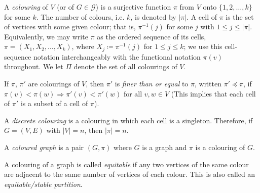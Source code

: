 \begin{definition}\label{def: colouring}
    A \emph{colouring} of $V$ (or of $G \mathrel{\in}\mathcal{G}$) is a surjective function $\pi$ from $V$ onto $\{1, 2,\ldots, k\}$ for some $k$. The number of colours, i.e. $k$, is denoted by $|\pi|$. A cell of $\pi$ is the set of vertices with some given colour; that is, $\pi^{-1} (j)$ for some $j$ with $1 \mathrel{\leq} j \mathrel{\leq} |\pi|$. Equivalently, we may write $\pi$ as the ordered sequence of its cells, $\pi = (X_1, X_2, \ldots, X_k)$, where $X_j \coloneqq \pi^{-1}(j)$ for $1 \le j \le k$; we use this cell-sequence notation interchangeably with the functional notation $\pi(v)$ throughout. We let $\Pi$ denote the set of all colourings of $V$.
    
    If $\pi$, $\pi'$ are colourings of $V$, then $\pi'$ is \emph{ﬁner than or equal} to $\pi$, written $\pi' \preccurlyeq\pi$, if $\pi(v) < \pi(w) \Rightarrow\pi' (v) < \pi' (w)$ for all $v, w \mathrel{\in}V$ (This implies that each cell of $\pi'$ is a subset of a cell of $\pi$).
    

    A \emph{discrete colouring} is a colouring in which each cell is a singleton. Therefore, if $G=(V,E)$ with $|V|=n$, then $|\pi|=n$.

    A \emph{coloured graph} is a pair $ (G, \pi)$ where $G$ is a graph and $\pi$ is a colouring of $G$.
    
    A colouring of a graph is called \emph{equitable} if any two vertices of the same colour are adjacent to the same number of vertices of each colour. This is also called an \emph{equitable/stable partition}.
    \end{definition}

\vspace{1em}

